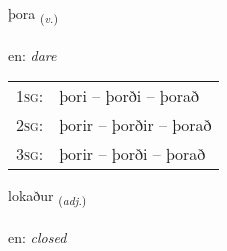 \documentclass[frontgrid, backgrid]{flacards}\usepackage[]{graphicx}\usepackage[]{color}
\begin{document}
\renewcommand{\flhead}{\vskip5pt \fboxsep=0pt {\small\bfseries\footnotesize Sagnorð | Verb}}
\renewcommand{\fcfoot}{\vskip5pt \fboxsep=0pt \hspace{2pt}{\small\bfseries\footnotesize 2K}}

\renewcommand{\blhead}{\vskip5pt {\small\bfseries\footnotesize Sagnorð | Verb }}
\renewcommand{\bcfoot}{\vskip5pt \hspace{2pt}{\small\bfseries\footnotesize 2K}}


{þora \small{\textsubscript{(\textit{v.})}} \\[1ex] %
\textphonetic{[θɔːra]} \\
en: \emph{dare} \\  [2ex]
\renewcommand*{\arraystretch}{0.8}
\begin{tabular}{p{1cm}l}
\textsc{1sg}: & þori -- þorði -- þorað \\ 
\textsc{2sg}: & þorir -- þorðir -- þorað \\ 
\textsc{3sg}: & þorir -- þorði -- þorað \\ 
\end{tabular}
}

\renewcommand{\flhead}{\vskip5pt \fboxsep=0pt {\small\bfseries\footnotesize Lýsingarorð | Adjective}}
\renewcommand{\fcfoot}{\vskip5pt \fboxsep=0pt \hspace{2pt}{\small\bfseries\footnotesize 2K}}

\renewcommand{\blhead}{\vskip5pt {\small\bfseries\footnotesize Lýsingarorð | Adjective }}
\renewcommand{\bcfoot}{\vskip5pt \hspace{2pt}{\small\bfseries\footnotesize 2K}}


{lokaður \small{\textsubscript{(\textit{adj.})}} \\[1ex] %
\textphonetic{[lɔːkaðʏr]} \\
en: \emph{closed} \\  [2ex]
\renewcommand*{\arraystretch}{0.8}
}
\end{document}
